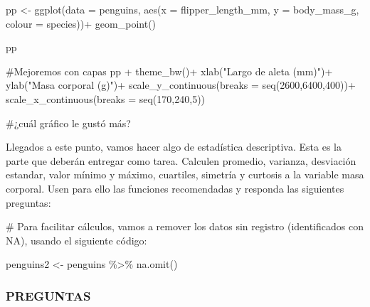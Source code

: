 \documentclass[
  letterpaper,
  DIV=11,
  numbers=noendperiod]{scrartcl}
\newenvironment{Shaded}{\begin{snugshade}}{\end{snugshade}}
\newcommand{\AttributeTok}[1]{\textcolor[rgb]{0.40,0.45,0.13}{#1}}
\newcommand{\CommentTok}[1]{\textcolor[rgb]{0.37,0.37,0.37}{#1}}
\newcommand{\DecValTok}[1]{\textcolor[rgb]{0.68,0.00,0.00}{#1}}
\newcommand{\FunctionTok}[1]{\textcolor[rgb]{0.28,0.35,0.67}{#1}}
\newcommand{\NormalTok}[1]{\textcolor[rgb]{0.00,0.23,0.31}{#1}}
\newcommand{\OtherTok}[1]{\textcolor[rgb]{0.00,0.23,0.31}{#1}}
\newcommand{\SpecialCharTok}[1]{\textcolor[rgb]{0.37,0.37,0.37}{#1}}
\newcommand{\StringTok}[1]{\textcolor[rgb]{0.13,0.47,0.30}{#1}}
\begin{document}
\begin{Shaded}
\begin{Highlighting}[]
\NormalTok{pp }\OtherTok{\textless{}{-}} \FunctionTok{ggplot}\NormalTok{(}\AttributeTok{data =}\NormalTok{ penguins, }\FunctionTok{aes}\NormalTok{(}\AttributeTok{x =}\NormalTok{ flipper\_length\_mm,}
                                  \AttributeTok{y =}\NormalTok{ body\_mass\_g, }
                                  \AttributeTok{colour =}\NormalTok{ species))}\SpecialCharTok{+}
      \FunctionTok{geom\_point}\NormalTok{()}
  
\NormalTok{pp  }
  
\CommentTok{\#Mejoremos con capas}
\NormalTok{pp }\SpecialCharTok{+}  \FunctionTok{theme\_bw}\NormalTok{()}\SpecialCharTok{+}
      \FunctionTok{xlab}\NormalTok{(}\StringTok{"Largo de aleta (mm)"}\NormalTok{)}\SpecialCharTok{+}
      \FunctionTok{ylab}\NormalTok{(}\StringTok{"Masa corporal (g)"}\NormalTok{)}\SpecialCharTok{+}
      \FunctionTok{scale\_y\_continuous}\NormalTok{(}\AttributeTok{breaks =} \FunctionTok{seq}\NormalTok{(}\DecValTok{2600}\NormalTok{,}\DecValTok{6400}\NormalTok{,}\DecValTok{400}\NormalTok{))}\SpecialCharTok{+}
      \FunctionTok{scale\_x\_continuous}\NormalTok{(}\AttributeTok{breaks =} \FunctionTok{seq}\NormalTok{(}\DecValTok{170}\NormalTok{,}\DecValTok{240}\NormalTok{,}\DecValTok{5}\NormalTok{))}
      
\CommentTok{\#¿cuál gráfico le gustó más? }
\end{Highlighting}
\end{Shaded}

Llegados a este punto, vamos hacer algo de estadística descriptiva. Esta
es la parte que deberán entregar como tarea. Calculen promedio,
varianza, desviación estandar, valor mínimo y máximo, cuartiles,
simetría y curtosis a la variable masa corporal. Usen para ello las
funciones recomendadas y responda las siguientes preguntas:

\begin{Shaded}
\begin{Highlighting}[]
\CommentTok{\# Para facilitar cálculos, vamos a remover los datos sin registro (identificados con NA), usando el siguiente código:}

\NormalTok{penguins2 }\OtherTok{\textless{}{-}}\NormalTok{ penguins }\SpecialCharTok{\%\textgreater{}\%}
  \FunctionTok{na.omit}\NormalTok{()}
\end{Highlighting}
\end{Shaded}

\hypertarget{preguntas}{%
\subsubsection{PREGUNTAS}\label{preguntas}}
\end{document}

